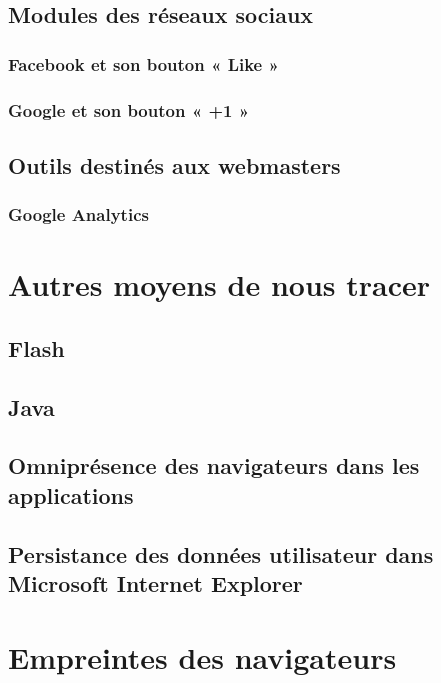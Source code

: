 	\subsection{Modules des réseaux sociaux}
		
		\subsubsection{Facebook et son bouton « Like »}
			
		\subsubsection{Google et son bouton « +1 »}
			
	\subsection{Outils destinés aux webmasters}
		
		\subsubsection{Google Analytics}
		\label{google_analytics}


\section{Autres moyens de nous tracer}
	\subsection{Flash}
	
	\subsection{Java}
	
	\subsection{Omniprésence des navigateurs dans les applications}
		
	\subsection{Persistance des données utilisateur dans Microsoft Internet Explorer}
		


\section{Empreintes des navigateurs}
\label{fingerprinters}
